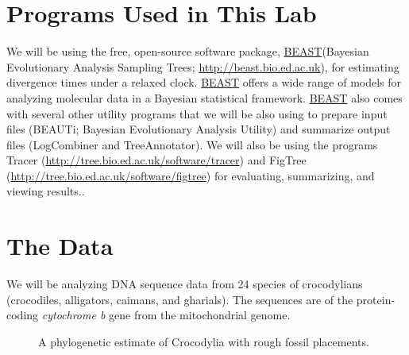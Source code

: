 \documentclass{article}
\newcommand{\program}[1]{#1\xspace}
\newcommand{\beast}{\href{http://beast.bio.ed.ac.uk/Main_Page}{\program{BEAST}}\xspace}
\begin{document}
\section{Programs Used in This Lab}
We will be using the free, open-source software package, \beast (Bayesian
Evolutionary Analysis Sampling Trees;
\href{http://beast.bio.ed.ac.uk}{\url{http://beast.bio.ed.ac.uk}}), for
estimating divergence times under a relaxed clock.
\beast offers a wide range of models for analyzing molecular data in
a Bayesian statistical framework.
\beast also comes with several other utility programs that we will be also
using to prepare input files (\program{BEAUTi}; Bayesian Evolutionary Analysis
Utility) and summarize output files (\program{LogCombiner and TreeAnnotator}).
We will also be using the programs \program{Tracer}
(\href{http://tree.bio.ed.ac.uk/software/tracer}{\url{http://tree.bio.ed.ac.uk/software/tracer}})
and \program{FigTree}
(\href{http://tree.bio.ed.ac.uk/software/figtree}{\url{http://tree.bio.ed.ac.uk/software/figtree}})
for evaluating, summarizing, and viewing results..

\section{The Data}
We will be analyzing DNA sequence data from 24 species of crocodylians
(crocodiles, alligators, caimans, and gharials).
The sequences are of the protein-coding \emph{cytochrome b} gene from the
mitochondrial genome.

    \begin{figure}[htbp]
        \centering
        \caption{A phylogenetic estimate of Crocodylia with rough fossil placements.}
        \label{fig:crocFossils}
    \end{figure}
\end{document}
